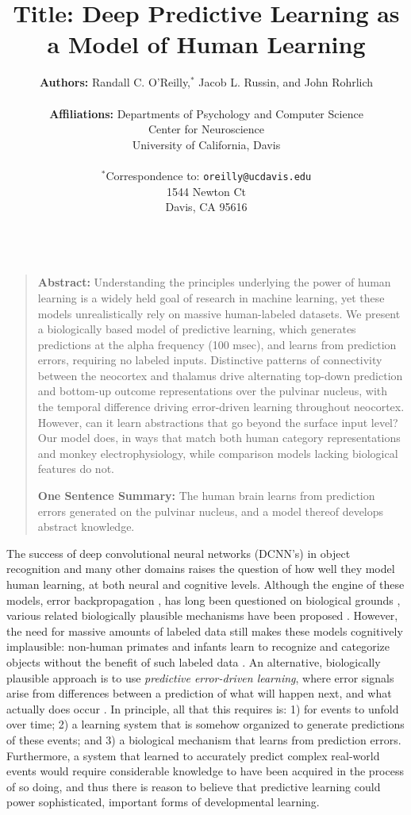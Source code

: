 \documentclass[12pt,twoside]{article}
\title{ {\bf Title:} Deep Predictive Learning as a Model of Human Learning }
\author{{\bf Authors:} Randall C. O'Reilly,$^\ast$ Jacob L. Russin, and John Rohrlich\\
\vspace{.15in}\\
  {\bf Affiliations:} Departments of Psychology and Computer Science\\
  Center for Neuroscience\\
  University of California, Davis \\
  \vspace{.15in}\\
  $^\ast$Correspondence to: \texttt{oreilly@ucdavis.edu}\\
  1544 Newton Ct\\
  Davis, CA 95616\\
  \\}
\newif\myifpdf
\newenvironment{sciabstract}{%
\begin{quote}}
{\end{quote}}
\begin{document}
\sloppy
\raggedbottom

\maketitle 

\begin{sciabstract}
{\bf Abstract:} Understanding the principles underlying the power of human learning is a widely held goal of research in machine learning, yet these models unrealistically rely on massive human-labeled datasets.  We present a biologically based model of predictive learning, which generates predictions at the alpha frequency (100 msec), and learns from prediction errors, requiring no labeled inputs.  Distinctive patterns of connectivity between the neocortex and thalamus drive alternating top-down prediction and bottom-up outcome representations over the pulvinar nucleus, with the temporal difference driving error-driven learning throughout neocortex.  However, can it learn abstractions that go beyond the surface input level?  Our model does, in ways that match both human category representations and monkey electrophysiology, while comparison models lacking biological features do not.

{\bf One Sentence Summary:} The human brain learns from prediction errors generated on the pulvinar nucleus, and a model thereof develops abstract knowledge.

\end{sciabstract}

\clearpage

\pagestyle{myheadings}

The success of deep convolutional neural networks (DCNN's) \cite{KrizhevskySutskeverHinton12,LeCunBengioHinton15,Schmidhuber15a} in object recognition and many other domains raises the question of how well they model human learning, at both neural and cognitive levels.  Although the engine of these models, error backpropagation \cite{RumelhartHintonWilliams86}, has long been questioned on biological grounds \cite{Crick89}, various related biologically plausible mechanisms have been proposed \cite{OReilly96,XieSeung03,BengioMesnardFischerEtAl17}.  However, the need for massive amounts of labeled data still makes these models cognitively implausible: non-human primates and infants learn to recognize and categorize objects without the benefit of such labeled data \cite{LakeUllmanTenenbaumEtAl17}.  An alternative, biologically plausible approach is to use {\em predictive error-driven learning}, where error signals arise from differences between a prediction of what will happen next, and what actually does occur \cite{Elman90,ElmanBatesKarmiloff-SmithEtAl96}.  In principle, all that this requires is: 1) for events to unfold over time; 2) a learning system that is somehow organized to generate predictions of these events; and 3) a biological mechanism that learns from prediction errors. Furthermore, a system that learned to accurately predict complex real-world events would require considerable knowledge to have been acquired in the process of so doing, and thus there is reason to believe that predictive learning could power sophisticated, important forms of developmental learning.
\end{document}
